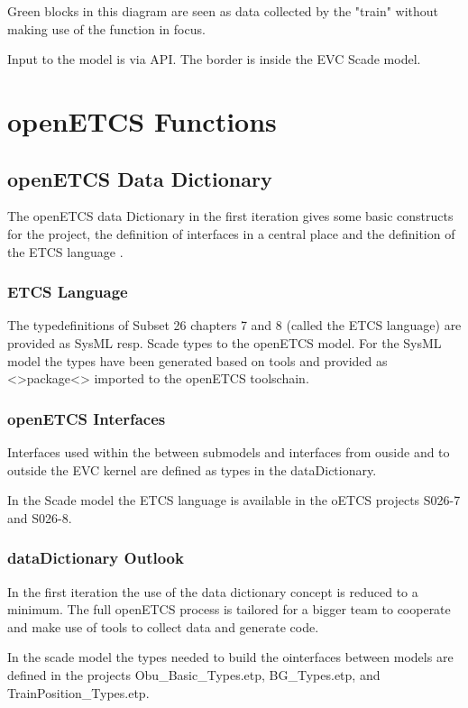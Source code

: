 \documentclass{template/openetcs_report}
\begin{document}
Green blocks in this diagram are seen as data collected by the "train" without making use of the function in focus.

Input to the model is via API. The border is inside the EVC Scade model. 



\chapter{openETCS Functions}

\section{openETCS Data Dictionary}
The openETCS data Dictionary in the first iteration gives some basic constructs for the project, the definition of interfaces in a central place and the definition of the ETCS language \cite{dataDictionary}.

\subsection{ETCS Language}
The typedefinitions of Subset 26 chapters 7 and 8 (called the ETCS language) are provided as SysML resp. Scade types to the openETCS model. For the SysML model the types have been generated based on tools and provided as <>package<> imported to the openETCS toolschain.

\subsection{openETCS Interfaces}
Interfaces used within the between submodels and interfaces from ouside and to outside the EVC kernel are defined as types in the dataDictionary.

In the Scade model  the ETCS language is available in the oETCS projects S026-7 and S026-8.

\subsection{dataDictionary Outlook}
In the first iteration the use of the data dictionary concept is reduced to a minimum. The full openETCS process is tailored for a bigger team to cooperate and make use of tools to collect data and generate code. 

In the scade model the types needed to build the ointerfaces between models are defined in the projects Obu\_Basic\_Types.etp, BG\_Types.etp, and TrainPosition\_Types.etp.
\end{document}
